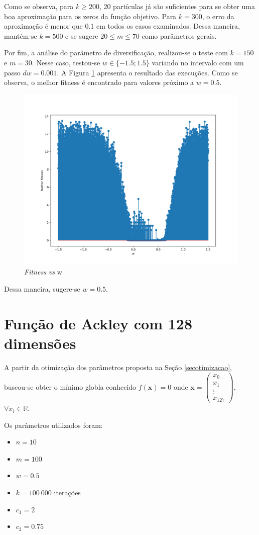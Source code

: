 \documentclass[12pt]{article}
\begin{document}
	Como se observa, para $k \geq 200$, 20 partículas já são suficientes para se obter uma boa aproximação para os zeros da função objetivo. Para $k=300$, o erro da aproximação é menor que $0.1$ em todos os casos examinados. Dessa maneira, mantém-se $k=500$ e se sugere $  20 \leq m \leq 70 $ como parâmetros gerais. 
	
	Por fim, a análise do parâmetro de diversificação, realizou-se o teste com $k=150$ e $m=30$. Nesse caso, testou-se $w \in  \{ -1.5; 1.5\}$ variando no intervalo com um passo $dw = 0.001$. 
	A Figura \ref{fig_possivelresultadow} apresenta o resultado das execuções. Como se observa, o melhor fitness é encontrado para valores próximo a $w=0.5$.
	
	\begin{figure}[h!]
		\centering
		\includegraphics[width=0.7\linewidth]{../possivel_resultado_w}
		\caption{\textit{Fitness vs} w}
		\label{fig_possivelresultadow}
	\end{figure}
	Dessa maneira, sugere-se $w = 0.5$. 
	
	
	\section{Função de Ackley com 128 dimensões}
	A partir da otimização dos parâmetros proposta na Seção \ref{secotimizacao}, buscou-se obter o mínimo globla conhecido $f(\mathbf{x}) = 0$ onde $\mathbf{x}= \begin{pmatrix}
		x_0 \\
		x_1 \\
		\vdots \\
		x_{127}
	\end{pmatrix}$, $\forall x_i \in \mathbb{R}$.
	
	Os parâmetros utilizados foram: 
	\begin{itemize}[itemsep=0pt, topsep=0pt, parsep=0pt, partopsep=0pt]
		\item $n = 10$
		\item $m = 100$
		\item $w = 0.5$
		\item $k = 100 \ 000$ iterações
		\item $c_1 = 2$
		\item $c_2 = 0.75$
	\end{itemize}
	
\end{document}
